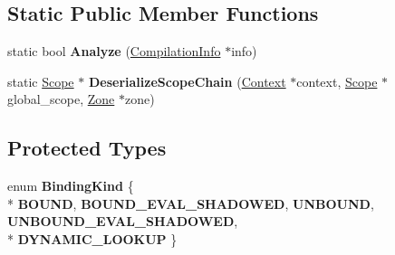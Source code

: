 \subsection*{Static Public Member Functions}
\begin{DoxyCompactItemize}
\item 
\hypertarget{classv8_1_1internal_1_1_scope_a293698598869f07a08c7177440dcb73a}{}static bool {\bfseries Analyze} (\hyperlink{classv8_1_1internal_1_1_compilation_info}{Compilation\+Info} $\ast$info)\label{classv8_1_1internal_1_1_scope_a293698598869f07a08c7177440dcb73a}

\item 
\hypertarget{classv8_1_1internal_1_1_scope_ae9c5567da0e3af55a9ee24cce893cf85}{}static \hyperlink{classv8_1_1internal_1_1_scope}{Scope} $\ast$ {\bfseries Deserialize\+Scope\+Chain} (\hyperlink{classv8_1_1internal_1_1_context}{Context} $\ast$context, \hyperlink{classv8_1_1internal_1_1_scope}{Scope} $\ast$global\+\_\+scope, \hyperlink{classv8_1_1internal_1_1_zone}{Zone} $\ast$zone)\label{classv8_1_1internal_1_1_scope_ae9c5567da0e3af55a9ee24cce893cf85}

\end{DoxyCompactItemize}
\subsection*{Protected Types}
\begin{DoxyCompactItemize}
\item 
\hypertarget{classv8_1_1internal_1_1_scope_ac0377699b350082cce5e931f1dbfa145}{}enum {\bfseries Binding\+Kind} \{ \\*
{\bfseries B\+O\+U\+N\+D}, 
{\bfseries B\+O\+U\+N\+D\+\_\+\+E\+V\+A\+L\+\_\+\+S\+H\+A\+D\+O\+W\+E\+D}, 
{\bfseries U\+N\+B\+O\+U\+N\+D}, 
{\bfseries U\+N\+B\+O\+U\+N\+D\+\_\+\+E\+V\+A\+L\+\_\+\+S\+H\+A\+D\+O\+W\+E\+D}, 
\\*
{\bfseries D\+Y\+N\+A\+M\+I\+C\+\_\+\+L\+O\+O\+K\+U\+P}
 \}\label{classv8_1_1internal_1_1_scope_ac0377699b350082cce5e931f1dbfa145}

\end{DoxyCompactItemize}

